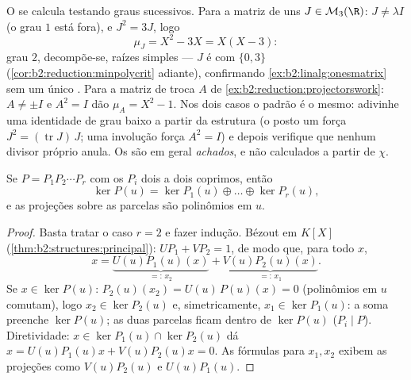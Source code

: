 \begin{example}\label{ex:b2:reduction:minpolyhand}
O  se calcula testando graus
sucessivos. Para a matriz de uns $J \in \mathcal{M}_3(\R)$:
$J \neq \lambda I$ (o grau $1$ está fora), e $J^2 = 3J$, logo
\[
\mu_J = X^2 - 3X = X(X - 3) :
\]
grau $2$, decompõe-se, raízes simples --- $J$ é  com
 $\{0, 3\}$ (\cref{cor:b2:reduction:minpolycrit} adiante),
confirmando \cref{ex:b2:linalg:onesmatrix} sem um único
. Para a matriz de troca $A$ de
\cref{ex:b2:reduction:projectorswork}: $A \neq \pm I$ e $A^2
= I$ dão $\mu_A = X^2 - 1$. Nos dois casos o padrão é o
mesmo: adivinhe uma identidade de grau baixo a partir da estrutura
(o posto um força $J^2 = (\operatorname{tr}J)\,J$; uma involução
força $A^2 = I$) e depois verifique que nenhum divisor próprio
anula. Os  são em geral \emph{achados}, e não
calculados a partir de $\chi$.
\end{example}

\begin{theorem}\label{thm:b2:reduction:kernels}
Se $P = P_1 P_2 \cdots P_r$ com os $P_i$ dois a dois coprimos,
então
\[
\ker P(u) = \ker P_1(u) \oplus \dots \oplus \ker P_r(u),
\]
e as projeções sobre as parcelas são polinômios em $u$.
\end{theorem}

\begin{proof}
Basta tratar o caso $r = 2$ e fazer indução. Bézout em $K[X]$
(\cref{thm:b2:structures:principal}): $U P_1 + V P_2 = 1$, de modo que, para
todo $x$,
\[
x = \underbrace{U(u)P_1(u)(x)}_{=:\,x_2}
+ \underbrace{V(u)P_2(u)(x)}_{=:\,x_1}.
\]
Se $x \in \ker P(u)$: $P_2(u)(x_2) = U(u)\,P(u)(x) = 0$ (polinômios
em $u$ comutam), logo $x_2 \in \ker P_2(u)$ e, simetricamente, $x_1
\in \ker P_1(u)$: a soma preenche $\ker P(u)$; as duas parcelas ficam
dentro de $\ker P(u)$ ($P_i \mid P$). Diretividade: $x \in \ker P_1(u)
\cap \ker P_2(u)$ dá $x = U(u)P_1(u)x + V(u)P_2(u)x = 0$. As
fórmulas para $x_1, x_2$ exibem as projeções como $V(u)P_2(u)$ e
$U(u)P_1(u)$.
\end{proof}

